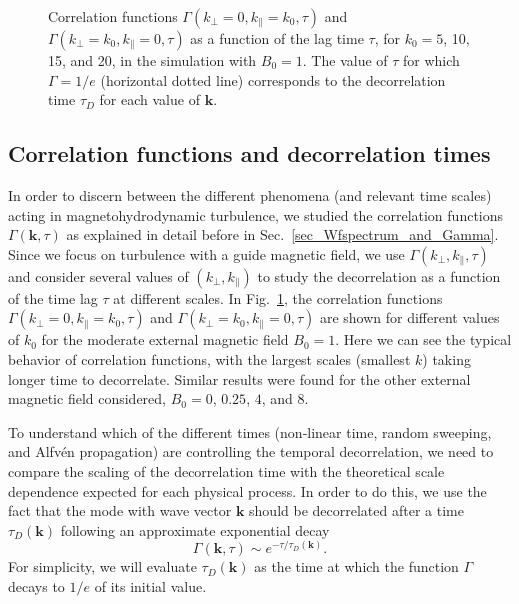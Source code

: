\documentclass[aip,pop,reprint,amsmath,amssymb,floatfix]{revtex4-1}
\renewcommand{\vec}[1]{\mathbf{#1}}
\begin{document}
\begin{figure}
  \centering

  \caption{Correlation functions
    $\Gamma(k_\perp=0,k_\parallel=k_0,\tau)$ and
    $\Gamma(k_\perp=k_0,k_\parallel=0,\tau)$ as a function of the lag
    time $\tau$, for $k_0=5$, 10, 15, and 20, in the simulation with
    $B_0=1$. The value of $\tau$ for which $\Gamma=1/e$ (horizontal
    dotted line) corresponds to the decorrelation time $\tau_D$ for
    each value of $\vec{k}$.}
  \label{fig4:B1_bvf_b_kperp/kpara0}
\end{figure}


\subsection{Correlation functions and decorrelation times}

In order to discern between the different phenomena (and relevant time
scales) acting in magnetohydrodynamic turbulence, we studied the
correlation functions $\Gamma(\vec{k},\tau)$ as explained in detail
before in Sec.~\ref{sec_Wfspectrum_and_Gamma}. Since we focus on
turbulence with a guide magnetic field, we use
$\Gamma(k_\perp,k_\parallel,\tau)$ and consider several values of
$(k_\perp,k_\parallel)$ to study the decorrelation as a function of
the time lag $\tau$ at different scales. In 
Fig.~\ref{fig4:B1_bvf_b_kperp/kpara0}, the correlation functions
$\Gamma(k_\perp=0,k_\parallel=k_0,\tau)$ and
$\Gamma(k_\perp=k_0,k_\parallel=0,\tau)$ are shown for different
values of $k_0$ for the moderate external magnetic field $B_0=1$. Here
we can see the typical behavior of correlation functions, with the
largest scales (smallest $k$) taking longer time to
decorrelate. Similar results were found for the other external
magnetic field considered, $B_0=0$, $0.25$, $4$, and $8$.

To understand which of the different times (non-linear time, random
sweeping, and Alfv\'en propagation) are controlling the temporal
decorrelation, we need to compare the scaling of the decorrelation
time with the theoretical scale dependence expected for each physical
process. In order to do this, we use the fact that the mode with wave 
vector $\vec{k}$ should be decorrelated after a time $\tau_D(\vec{k})$
following an approximate exponential decay
\begin{equation}
\Gamma(\vec{k},\tau) \sim e^{-\tau/\tau_D(\vec{k})}.
\end{equation}
For simplicity, we will evaluate $\tau_D(\vec{k})$ as the time at which
the function $\Gamma$ decays to $1/e$ of its initial value.
\end{document}
